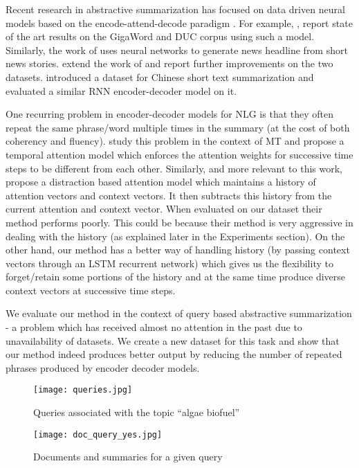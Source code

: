 \documentclass[11pt]{article}
\begin{document}
Recent research in abstractive summarization has focused on data driven neural models based on the encode-attend-decode paradigm \cite{bahdanau2014neural}.  For example, \cite{rush2015neural}, report state of the art results on the GigaWord and DUC corpus using such a model. Similarly, the work of  uses neural networks to generate news headline from short news stories.  extend the work of  and report further improvements on the two datasets.  introduced a dataset for Chinese short text summarization and evaluated a similar RNN encoder-decoder model on it.

One recurring problem in encoder-decoder models for NLG is that they  often repeat the same phrase/word multiple times in the summary (at the cost of both coherency and fluency).  study this problem in the context of MT and propose a temporal attention model which enforces the attention weights for successive time steps to be different from each other. Similarly, and more relevant to this work,  propose a distraction based attention model which maintains a history of attention vectors and context vectors. It then subtracts this history from the current attention and context vector. When evaluated on our dataset their method performs poorly. This could be because their method is very aggressive in dealing with the history (as explained later in the Experiments section). On the other hand, our method has a better way of handling history (by passing context vectors through an LSTM recurrent network) which gives us the flexibility to forget/retain some portions of the history and at the same time produce diverse context vectors at successive time steps.    

We evaluate our method in the context of query based abstractive summarization - a problem which has received almost no attention in the past due to unavailability of datasets. We create a new dataset for this task and show that our method indeed produces better output by reducing the number of repeated phrases produced by encoder decoder models. 

\begin{figure*}[!tbh]
\begin{minipage}{0.5\textwidth}
\texttt{[image: queries.jpg]}
\caption{Queries associated with the topic ``algae biofuel''}
\label{q}
\end{minipage}
\begin{minipage}{0.5\textwidth}
\texttt{[image: doc\_query\_yes.jpg]}
\caption{Documents and summaries for a given query}
\label{d}
\end{minipage}

\end{figure*}
\end{document}
